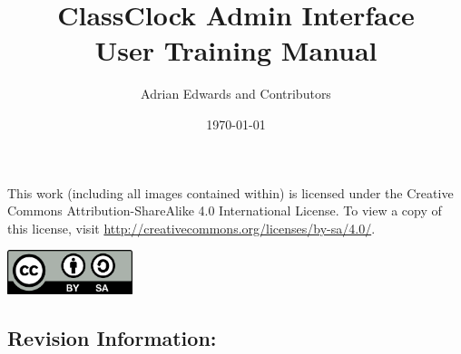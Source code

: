 \documentclass{article}
\title{ClassClock Admin Interface \\User Training Manual}
\author{Adrian Edwards and Contributors}
\date{\today}
\begin{document}
\makeatletter
\begin{titlepage}
    
	\begin{FlushRight}
		\vspace*{1cm}
			
		\Huge
		\textbf{\@title}
			
		\vspace{0.5cm}
		\LARGE
		\@date
			
		\vspace{1.5cm}
			
		\textbf{\@author}
	\end{FlushRight}
		
	\vfill
	\begin{center}
        
		{This work (including all images contained within) is licensed under the Creative Commons Attribution-ShareAlike 4.0
		International License. To view a copy of this license, visit \href{http://creativecommons.org/licenses/by-sa/4.0/}{http://creativecommons.org/licenses/by-sa/4.0/}.}



		\includegraphics[width=1.439in,height=0.5043in]{images/CCBYSA.png}
            
    \end{center}
\end{titlepage}
\makeatother

\clearpage
\large
\subsection*{Revision Information:}
\end{document}
